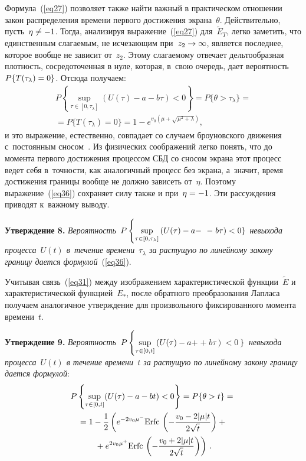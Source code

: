 \begin{multicols}{2}
Формула~(\ref{eq27}) позволяет также найти важный в практическом отношении закон распределения времени первого достижения экрана~$\theta$. Действительно, пусть~$\eta \hm\ne -1$. Тогда, анализируя выражение~(\ref{eq27}) для~$\tilde E_T$, легко заметить, что единственным слагаемым, не исчезающим при~$z_2 \hm\to \infty$, является последнее, которое вообще не зависит от~$z_2$. Этому слагаемому отвечает дельтообразная плотность, сосредоточенная в нуле, которая, в~свою очередь, дает вероятность~$P\{ T(\tau_\lambda) \hm= 0\}$. Отсюда получаем:
\begin{multline}
  \label{eq36}
  P \left \{\mathop{\sup}\limits_{\tau \in [0, \tau_\lambda]} (U(\tau)- a - b \tau) < 0 \right\} = P \{ \theta > \tau_\lambda \} ={}\\
   {}=P \{ T(\tau_\lambda) = 0\} = 1-e^{v_0( \mu  + \sqrt{ \mu ^2 +\lambda})},
\end{multline}
и это выражение, естественно, совпадает со случаем броуновского движения с~постоянным сносом~\cite{ref23}. Из физических соображений легко понять, что до момента первого достижения процессом СБД со сносом экрана этот процесс ведет себя в~точности, как аналогичный процесс без экрана, а~значит, время достижения границы вообще не должно зависеть от~$\eta$. Поэтому выражение~(\ref{eq36}) сохраняет силу также и при~$\eta\hm=-1$. Эти рассуждения приводят к~важному выводу.

\smallskip

\noindent
\textbf{Утверждение 8.}
\textit{Вероятность~$P \left \{\sup \limits_{\tau \in [0, \tau_\lambda]} \left(U(\tau) \hm- a \hm-\right.\right.$\linebreak $\left.\left.-\;b \tau\right) \hm< 0 \right\}$ невыхода процесса~$U(t)$ в~течение времени~$\tau_\lambda$ за рас\-ту\-щую по линейному закону границу дается формулой}~(\ref{eq36}).

\smallskip


Учитывая связь~(\ref{eq31}) между изображением характеристической функции~$\tilde E$ и характеристической функцией~$E_*$, после обратного преобразования Лап\-ла\-са получаем аналогичное утверждение для произвольного фиксированного момента времени~$t$.

\smallskip

\noindent
\textbf{Утверждение 9.}
  \textit{Вероятность~$P \left \{\sup \limits_{\tau \in [0, t]} \left(U(\tau) \hm- a\hm +\right.\right.$\linebreak $\left.\left.+\;b \tau\right) < 0 \right\}$ невыхода процесса~$U(t)$ в течение времени~$t$ за растущую по линейному закону границу дается формулой}:
  \begin{multline*}
     P \left\{\mathop{\sup}\limits_{\tau \in [0, t]} (U(\tau) - a - b t) < 0 \right\} = P \{ \theta > t \} ={}\\
      {}=1 - \displaystyle\frac{\displaystyle 1\mathstrut}{\displaystyle 2\mathstrut} \left( e^{-2 v_0 \mu^- } \mathrm{Erfc}\, \left( -\displaystyle\frac{\displaystyle v_0 - 2 |\mu| t\mathstrut}{\displaystyle 2 \sqrt{t}\mathstrut} \right) +{}\right.\\
\left.       {}+e^{2 v_0 \mu^+ } \mathrm{Erfc}\, \left( -\displaystyle\frac{\displaystyle v_0 + 2 |\mu| t\mathstrut}{\displaystyle 2 \sqrt{t}\mathstrut} \right) \right)\,.
  \end{multline*}


\end{multicols}
